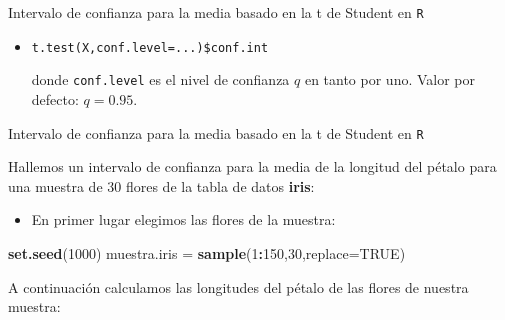 \documentclass[ignorenonframetext,]{beamer}
\newenvironment{Shaded}{\begin{snugshade}}{\end{snugshade}}
\newcommand{\DataTypeTok}[1]{\textcolor[rgb]{0.13,0.29,0.53}{#1}}
\newcommand{\DecValTok}[1]{\textcolor[rgb]{0.00,0.00,0.81}{#1}}
\newcommand{\KeywordTok}[1]{\textcolor[rgb]{0.13,0.29,0.53}{\textbf{#1}}}
\newcommand{\NormalTok}[1]{#1}
\newcommand{\OperatorTok}[1]{\textcolor[rgb]{0.81,0.36,0.00}{\textbf{#1}}}
\newcommand{\OtherTok}[1]{\textcolor[rgb]{0.56,0.35,0.01}{#1}}
\newcommand{\StringTok}[1]{\textcolor[rgb]{0.31,0.60,0.02}{#1}}
\providecommand{\tightlist}{%
  \setlength{\itemsep}{0pt}\setlength{\parskip}{0pt}}
\begin{document}
\begin{frame}[fragile]{Intervalo de confianza para la media basado en la
t de Student en \texttt{R}}
\protect\hypertarget{intervalo-de-confianza-para-la-media-basado-en-la-t-de-student-en-r}{}

\begin{itemize}
\item
\begin{verbatim}
t.test(X,conf.level=...)$conf.int
\end{verbatim}

  donde \texttt{conf.level} es el nivel de confianza \(q\) en tanto por
  uno. Valor por defecto: \(q=0.95\).
\end{itemize}

\end{frame}

\begin{frame}[fragile]{Intervalo de confianza para la media basado en la
t de Student en \texttt{R}}
\protect\hypertarget{intervalo-de-confianza-para-la-media-basado-en-la-t-de-student-en-r-1}{}

Hallemos un intervalo de confianza para la media de la longitud del
pétalo para una muestra de 30 flores de la tabla de datos \textbf{iris}:

\begin{itemize}
\tightlist
\item
  En primer lugar elegimos las flores de la muestra:
\end{itemize}

\begin{Shaded}
\begin{Highlighting}[]
\KeywordTok{set.seed}\NormalTok{(}\DecValTok{1000}\NormalTok{)}
\NormalTok{muestra.iris =}\StringTok{ }\KeywordTok{sample}\NormalTok{(}\DecValTok{1}\OperatorTok{:}\DecValTok{150}\NormalTok{,}\DecValTok{30}\NormalTok{,}\DataTypeTok{replace=}\OtherTok{TRUE}\NormalTok{)}
\end{Highlighting}
\end{Shaded}

A continuación calculamos las longitudes del pétalo de las flores de
nuestra muestra:

\begin{Shaded}
\end{Shaded}

\end{frame}
\end{document}
